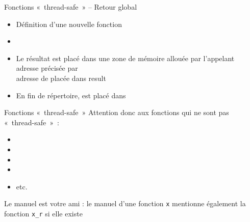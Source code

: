 \begin {frame} {Fonctions «~thread-safe~» -- Retour global}

    \begin {itemize}
	\item Définition d'une nouvelle fonction

	\item {}

	\item Le résultat est placé dans une zone de mémoire allouée
	    par l'appelant \\
	    \implique adresse précisée par  \\
	    \implique adresse de  placée dans \code
	    {result}

	\item En fin de répertoire,  est placé dans

    \end {itemize}

\end {frame}

\begin {frame} {Fonctions «~thread-safe~»}
    Attention donc aux fonctions qui ne sont pas «~thread-safe~»~:

    \begin {itemize}
	\item {} \implique {}
	\item {} \implique {}
	\item {} \implique {}
	\item {} \implique {}
	\item etc.
    \end {itemize}

    \vspace* {3mm}

    Le manuel est votre ami : le manuel d'une fonction \texttt {x}
    mentionne également la fonction \texttt {x\_r} si elle existe

\end {frame}


